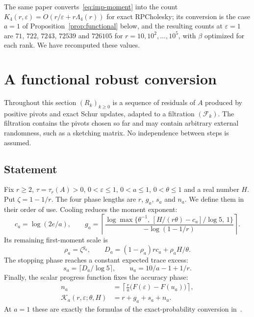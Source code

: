 \documentclass[11pt]{article}
\theoremstyle{definition}\newtheorem{definition}[theorem]{Definition}
\theoremstyle{remark}\newtheorem{remark}[theorem]{Remark}
\newcommand{\eps}{\varepsilon}
\newcommand{\calK}{\mathcal K}
\newcommand{\calF}{\mathcal F}
\newcommand{\1}{\mathbf 1}
\begin{document}
The same paper converts~\eqref{eq:imp-moment} into the count
$K_4(r,\eps)=O(r/\eps+r\Lambda_4(r))$ for exact RPCholesky; its
conversion is the case $a=1$ of Proposition~\ref{prop:functional} below,
and the resulting counts at $\eps=1$ are $71$, $722$, $7243$, $72539$
and $726105$ for $r=10,10^2,\dots,10^5$, with $\beta$ optimized for
each rank. We have recomputed these values.
\section{A functional robust conversion}\label{sec:robust}
Throughout this section $(R_k)_{k\ge0}$ is a sequence of residuals of
$A$ produced by positive pivots and exact Schur updates, adapted to a
filtration $(\calF_k)$. The filtration contains the pivots chosen so far
and may contain arbitrary external randomness, such as a sketching
matrix. No independence between steps is assumed.

\subsection{Statement}
Fix $r\ge2$, $\tau=\tau_r(A)>0$, $0<\eps\le1$, $0<a\le1$, $0<\theta\le1$
and a real number $H$. Put $\zeta=1-1/r$.
The four phase lengths are $r$, $g_a$, $s_a$ and $n_a$. We define them
in their order of use. Cooling reduces the moment exponent:
\begin{equation}\label{eq:g}
 c_a=\log(2e/a),\qquad
 g_a=\left\lceil\frac{\log\max\bigl\{\theta^{-1},\,[H/(r\theta)-c_a]/\log5,\,1\bigr\}}
                   {-\log(1-1/r)}\right\rceil.
\end{equation}
Its remaining first-moment scale is
\begin{equation}\label{eq:D}
 \rho_a=\zeta^{g_a},\qquad
 D_a=(1-\rho_a)rc_a+\rho_aH/\theta.
\end{equation}
The stopping phase reaches a constant expected trace excess:
\begin{equation}\label{eq:s}
 s_a=\lceil D_a/\log5\rceil,\qquad u_a=10/a-1+1/r.
\end{equation}
Finally, the scalar progress function fixes the accuracy phase:
\begin{equation}\label{eq:calK}
 \begin{aligned}
 n_a&=\left\lceil\frac ra\bigl(F(\eps)-F(u_a)\bigr)\right\rceil,\\
 \calK_a(r,\eps;\theta,H)&=r+g_a+s_a+n_a.
 \end{aligned}
\end{equation}
At $a=1$ these are exactly the formulas of the exact-probability
conversion in~\cite{RA01}.
\end{document}
